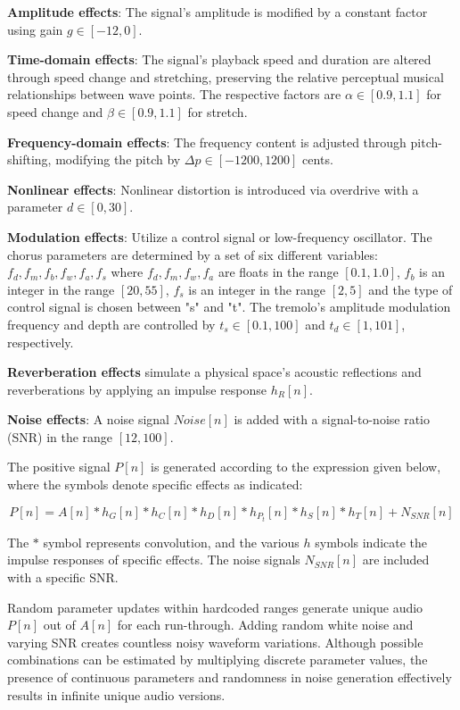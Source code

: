\textbf{Amplitude effects}: The signal's amplitude is modified by a constant factor using gain $g \in [-12, 0]$.

\textbf{Time-domain effects}: The signal's playback speed and duration are altered through speed change and stretching, preserving the relative perceptual musical relationships between wave points. The respective factors are $\alpha \in [0.9, 1.1]$ for speed change and $\beta \in [0.9, 1.1]$ for stretch.

\textbf{Frequency-domain effects}: The frequency content is adjusted through pitch-shifting, modifying the pitch by $\Delta p \in [-1200, 1200]$ cents.

\textbf{Nonlinear effects}: Nonlinear distortion is introduced via overdrive with a parameter $d \in [0, 30]$.

\textbf{Modulation effects}: Utilize a control signal or low-frequency oscillator. The chorus parameters are determined by a set of six different variables: $f_d, f_m, f_b, f_w, f_a, f_s$ where $f_d, f_m, f_w, f_a$ are floats in the range $[0.1, 1.0]$, $f_b$ is an integer in the range $[20, 55]$, $f_s$ is an integer in the range $[2, 5]$ and the type of control signal is chosen between "s" and "t". The tremolo's amplitude modulation frequency and depth are controlled by $t_s \in [0.1, 100]$ and $t_d \in [1, 101]$, respectively.

\textbf{Reverberation effects} simulate a physical space's acoustic reflections and reverberations by applying an impulse response $h_R[n]$.

\textbf{Noise effects}: A noise signal $Noise[n]$ is added with a signal-to-noise ratio (SNR) in the range $[12, 100]$.

The positive signal $P[n]$ is generated according to the expression given below, where the symbols denote specific effects as indicated:

\begin{equation}\label{eq:positive_signal}
P[n] = A[n] \ast h_{G}[n] \ast h_{C}[n] \ast h_{D}[n] \ast h_{P_t}[n] \ast h_{S}[n] \ast h_{T}[n] + N_{SNR}[n]
\end{equation}

The $\ast$ symbol represents convolution, and the various $h$ symbols indicate the impulse responses of specific effects. The noise signals $N_{SNR}[n]$ are included with a specific SNR.

Random parameter updates within hardcoded ranges generate unique audio $P[n]$ out of $A[n]$ for each run-through. Adding random white noise and varying SNR creates countless noisy waveform variations. Although possible combinations can be estimated by multiplying discrete parameter values, the presence of continuous parameters and randomness in noise generation effectively results in infinite unique audio versions.

